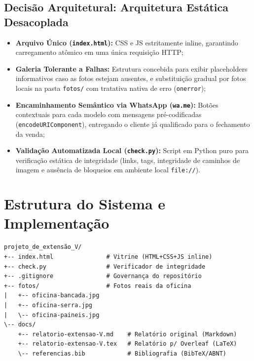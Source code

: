 \documentclass[12pt,a4paper]{article}
\begin{document}
\subsection{Decisão Arquitetural: Arquitetura Estática Desacoplada}
\begin{itemize}[leftmargin=*]
\item \textbf{Arquivo Único (\texttt{index.html}):} CSS e JS estritamente inline, garantindo carregamento atômico em uma única requisição HTTP;
\item \textbf{Galeria Tolerante a Falhas:} Estrutura concebida para exibir placeholders informativos caso as fotos estejam ausentes, e substituição gradual por fotos locais na pasta \texttt{fotos/} com tratativa nativa de erro (\texttt{onerror});
\item \textbf{Encaminhamento Semântico via WhatsApp (\texttt{wa.me}):} Botões contextuais para cada modelo com mensagens pré-codificadas (\texttt{encodeURIComponent}), entregando o cliente já qualificado para o fechamento da venda;
\item \textbf{Validação Automatizada Local (\texttt{check.py}):} Script em Python puro para verificação estática de integridade (links, tags, integridade de caminhos de imagem e ausência de bloqueios em ambiente local \texttt{file://}).
\end{itemize}



\section{Estrutura do Sistema e Implementação}

{\footnotesize
\begin{verbatim}
projeto_de_extensão_V/
+-- index.html               # Vitrine (HTML+CSS+JS inline)
+-- check.py                 # Verificador de integridade
+-- .gitignore               # Governança do repositório
+-- fotos/                   # Fotos reais da oficina
|   +-- oficina-bancada.jpg
|   +-- oficina-serra.jpg
|   \-- oficina-paineis.jpg
\-- docs/
    +-- relatorio-extensao-V.md    # Relatório original (Markdown)
    +-- relatorio-extensao-V.tex   # Relatório p/ Overleaf (LaTeX)
    \-- referencias.bib            # Bibliografia (BibTeX/ABNT)
\end{verbatim}}
\end{document}
